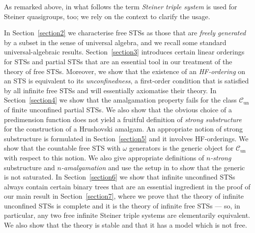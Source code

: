 \documentclass[a4paper, 11pt]{article}
\theoremstyle{note}
\begin{document}
As remarked above, in what follows the term \textit{Steiner triple system} is used for Steiner quasigroups, too; we rely on the context to clarify the usage. 

In Section~\ref{section2} we characterise free STSs as those that are \textit{freely generated} by a subset in the sense of universal algebra, and we recall some standard universal-algebraic results. Section~\ref{section3} introduces certain linear orderings for STSs and partial STSs that are an essential tool in our treatment of the theory of free STSs. Moreover, we show that the existence of an \textit{HF-ordering} on an STS is equivalent to its \textit{unconfinedness}, a first-order condition that is satisfied by all infinite free STSs and will essentially axiomatise their theory. In Section~\ref{section4} we show that the amalgamation property fails for the class $\mathcal{C}_\mathrm{un}$ of finite unconfined partial STSs. We also show that the obvious choice of a predimension function does not yield a fruitful definition of \textit{strong substructure} for the construction of a Hrushovski amalgam. An appropriate notion of strong substructure is formulated in Section~\ref{section5} and it involves HF-orderings. We show that the countable free STS with $\omega$ generators is the generic object for $\mathcal{C}_\mathrm{un}$ with respect to this notion. We also give appropriate definitions of \textit{$n$-strong} substructure and \textit{$n$-amalgamation} and use the setup in \cite{wagner} to show that the generic is not saturated. In Section~\ref{section6} we show that infinite unconfined STSs always contain certain binary trees that are an essential ingredient 
in the proof of our main result in Section~\ref{section7}, where we prove that the theory of infinite unconfined STSs is complete and it is the theory of infinite free STSs --- so, in particular, any two free infinite Steiner triple systems are elementarily equivalent. We also show that the theory is stable and that it has a model which is not free. 
\end{document}
